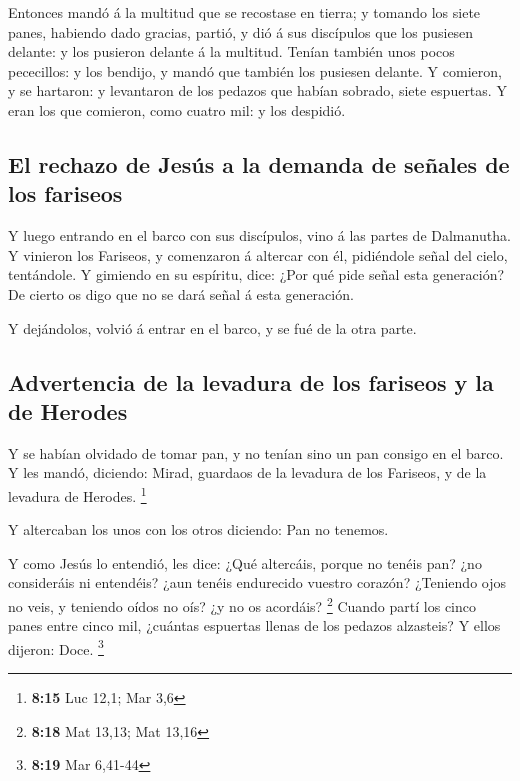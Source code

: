  Entonces mandó á la multitud que se recostase en tierra;
y tomando los siete panes, habiendo dado gracias, partió, y dió á sus
discípulos que los pusiesen delante: y los pusieron delante á la
multitud.  Tenían también unos pocos pececillos: y los
bendijo, y mandó que también los pusiesen delante.  Y
comieron, y se hartaron: y levantaron de los pedazos que habían sobrado,
siete espuertas.  Y eran los que comieron, como cuatro
mil: y los despidió.

\hypertarget{el-rechazo-de-jesuxfas-a-la-demanda-de-seuxf1ales-de-los-fariseos}{%
\subsection{El rechazo de Jesús a la demanda de señales de los
fariseos}\label{el-rechazo-de-jesuxfas-a-la-demanda-de-seuxf1ales-de-los-fariseos}}

 Y luego entrando en el barco con sus discípulos, vino á
las partes de Dalmanutha.  Y vinieron los Fariseos, y
comenzaron á altercar con él, pidiéndole señal del cielo, tentándole.
 Y gimiendo en su espíritu, dice: ¿Por qué pide señal
esta generación? De cierto os digo que no se dará señal á esta
generación.

 Y dejándolos, volvió á entrar en el barco, y se fué de
la otra parte.

\hypertarget{advertencia-de-la-levadura-de-los-fariseos-y-la-de-herodes}{%
\subsection{Advertencia de la levadura de los fariseos y la de
Herodes}\label{advertencia-de-la-levadura-de-los-fariseos-y-la-de-herodes}}

 Y se habían olvidado de tomar pan, y no tenían sino un
pan consigo en el barco.  Y les mandó, diciendo: Mirad,
guardaos de la levadura de los Fariseos, y de la levadura de Herodes.
\footnote{\textbf{8:15} Luc 12,1; Mar 3,6}

 Y altercaban los unos con los otros diciendo: Pan no
tenemos.

 Y como Jesús lo entendió, les dice: ¿Qué altercáis,
porque no tenéis pan? ¿no consideráis ni entendéis? ¿aun tenéis
endurecido vuestro corazón?  ¿Teniendo ojos no veis, y
teniendo oídos no oís? ¿y no os acordáis? \footnote{\textbf{8:18} Mat
  13,13; Mat 13,16}  Cuando partí los cinco panes entre
cinco mil, ¿cuántas espuertas llenas de los pedazos alzasteis? Y ellos
dijeron: Doce. \footnote{\textbf{8:19} Mar 6,41-44}

